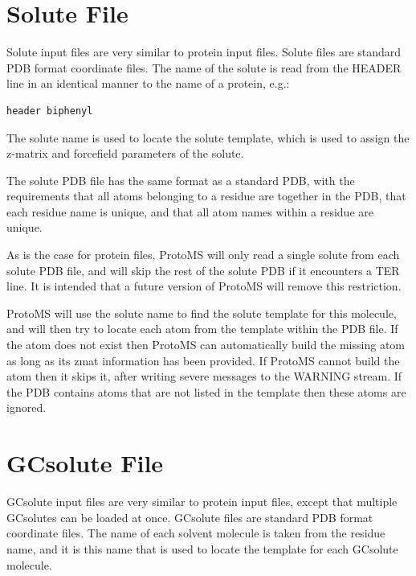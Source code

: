 \documentclass[letterpaper,10pt,english]{sphinxmanual}
\begin{document}
\section{Solute File}
\label{protoms:solpdb}\label{protoms:solute-file}
Solute input files are very similar to protein input files. Solute files are standard PDB format coordinate files. The name of the solute is read from the HEADER line in an identical manner to the name of a protein, e.g.:

\begin{Verbatim}[commandchars=\\\{\}]
header biphenyl
\end{Verbatim}

The solute name is used to locate the solute template, which is used to assign the z-matrix and forcefield parameters of the solute.

The solute PDB file has the same format as a standard PDB, with the requirements that all atoms belonging to a residue are together in the PDB, that each residue name is unique, and that all atom names within a residue are unique.

As is the case for protein files, ProtoMS will only read a single solute from each solute PDB file, and will skip the rest of the solute PDB if it encounters a TER line. It is intended that a future version of ProtoMS will remove this restriction.

ProtoMS will use the solute name to find the solute template for this molecule, and will then try to locate each atom from the template within the PDB file. If the atom does not exist then ProtoMS can automatically build the missing atom as long as its zmat information has been provided. If ProtoMS cannot build the atom then it skips it, after writing severe messages to the WARNING stream. If the PDB contains atoms that are not listed in the template then these atoms are ignored.


\section{GCsolute File}
\label{protoms:gcpdb}\label{protoms:gcsolute-file}
GCsolute input files are very similar to protein input files, except that multiple GCsolutes can be loaded at once. GCsolute files are standard PDB format coordinate files. The name of each solvent molecule is taken from the residue name, and it is this name that is used to locate the template for each GCsolute molecule.
\end{document}
